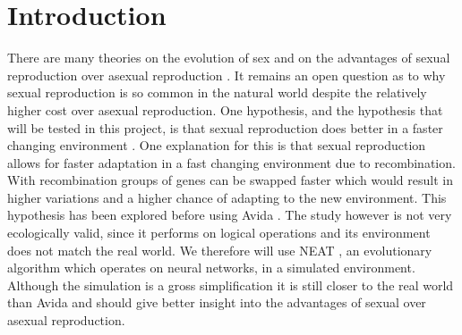 \section{Introduction}

There are many theories on the evolution of sex and on the advantages of sexual reproduction over asexual reproduction \cite{misevic}. 
It remains an open question as to why sexual reproduction is so common in the natural world despite the relatively higher cost over asexual reproduction. 
One hypothesis, and the hypothesis that will be tested in this project, is that sexual reproduction does better in a faster changing environment \cite{misevicchanging}. 
One explanation for this is that sexual reproduction allows for faster adaptation in a fast changing environment due to recombination. 
With recombination groups of genes can be swapped faster which would result in higher variations and a higher chance of adapting to the new environment. 
This hypothesis has been explored before using Avida \cite{misevicchanging}. 
The study however is not very ecologically valid, since it performs on logical operations and its environment does not match the real world. 
We therefore will use NEAT \cite{stanleyneat}, an evolutionary algorithm which operates on neural networks, in a simulated environment. 
Although the simulation is a gross simplification it is still closer to the real world than Avida and should give better insight into the advantages of sexual over asexual reproduction. 